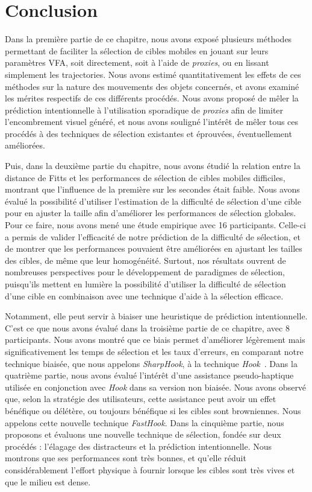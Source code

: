 	\section{Conclusion}
	Dans la première partie de ce chapitre, nous avons exposé plusieurs méthodes permettant de faciliter la sélection de cibles mobiles en jouant sur leurs paramètres VFA, soit directement, soit à l'aide de \emph{proxies}, ou en lissant simplement les trajectories. Nous avons estimé quantitativement les effets de ces méthodes sur la nature des mouvements des objets concernés, et avons examiné les mérites respectifs de ces différents procédés. Nous avons proposé de mêler la prédiction intentionnelle à l'utilisation sporadique de \emph{proxies} afin de limiter l'encombrement visuel généré, et nous avons souligné l'intérêt de mêler tous ces procédés à des techniques de sélection existantes et éprouvées, éventuellement améliorées.
	
	Puis, dans la deuxième partie du chapitre, nous avons étudié la relation entre la distance de Fitts et les performances de sélection de cibles mobiles difficiles, montrant que l'influence de la première sur les secondes était faible. Nous avons évalué la possibilité d'utiliser l'estimation de la difficulté de sélection d'une cible pour en ajuster la taille afin d'améliorer les performances de sélection globales. Pour ce faire, nous avons mené une étude empirique avec 16 participants. Celle-ci a permis de valider l'efficacité de notre prédiction de la difficulté de sélection, et de montrer que les performances pouvaient être améliorées en ajustant les tailles des cibles, de même que leur homogénéité. Surtout, nos résultats ouvrent de nombreuses perspectives pour le développement de paradigmes de sélection, puisqu'ils mettent en lumière la possibilité d'utiliser la difficulté de sélection d'une cible en combinaison avec une technique d'aide à la sélection efficace.
	
	Notamment, elle peut servir à biaiser une heuristique de prédiction intentionnelle. C'est ce que nous avons évalué dans la troisième partie de ce chapitre, avec 8 participants. Nous avons montré que ce biais permet d'améliorer légèrement mais significativement les temps de sélection et les taux d'erreurs, en comparant notre technique biaisée, que nous appelons \emph{SharpHook}, à la technique \emph{Hook}~\cite{ortega2013hook}. Dans la quatrième partie, nous avons évalué l'intérêt d'une assistance pseudo-haptique utilisée en conjonction avec \emph{Hook} dans sa version non biaisée. Nous avons observé que, selon la stratégie des utilisateurs, cette assistance peut avoir un effet bénéfique ou délétère, ou toujours bénéfique si les cibles sont browniennes. Nous appelons cette nouvelle technique \emph{FastHook}. Dans la cinquième partie, nous proposons et évaluons une nouvelle technique de sélection, fondée sur deux procédés : l'élagage des distracteurs et la prédiction intentionnelle. Nous montrons que ses performances sont très bonnes, et qu'elle réduit considérablement l'effort physique à fournir lorsque les cibles sont très vives et que le milieu est dense.
	
